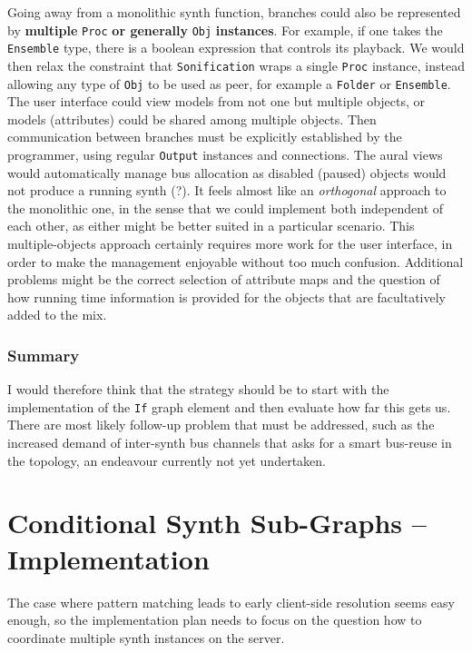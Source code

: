 \documentclass[11pt,a4paper]{article}
\begin{document}
Going away from a monolithic synth function, branches could also be represented by \textbf{multiple }\verb!Proc!\textbf{ or generally }\verb!Obj!\textbf{ instances}. For example, if one takes the \verb!Ensemble! type, there is a boolean expression that controls its playback. We would then relax the constraint that \verb!Sonification! wraps a single \verb!Proc! instance, instead allowing any type of \verb!Obj! to be used as peer, for example a \verb!Folder! or \verb!Ensemble!. The user interface could view models from not one but multiple objects, or models (attributes) could be shared among multiple objects. Then communication between branches must be explicitly established by the programmer, using regular \verb!Output! instances and connections. The aural views would automatically manage bus allocation as disabled (paused) objects would not produce a running synth (?). It feels almost like an \emph{orthogonal} approach to the monolithic one, in the sense that we could implement both independent of each other, as either might be better suited in a particular scenario. This multiple-objects approach certainly requires more work for the user interface, in order to make the management enjoyable without too much confusion. Additional problems might be the correct selection of attribute maps and the question of how running time information is provided for the objects that are facultatively added to the mix.

\subsubsection*{Summary}

I would therefore think that the strategy should be to start with the implementation of the \verb!If! graph element and then evaluate how far this gets us. There are most likely follow-up problem that must be addressed, such as the increased demand of inter-synth bus channels that asks for a smart bus-reuse in the topology, an endeavour currently not yet undertaken.

\section{Conditional Synth Sub-Graphs -- Implementation}

The case where pattern matching leads to early client-side resolution seems easy enough, so the implementation plan needs to focus on the question how to coordinate multiple synth instances on the server.
\end{document}
